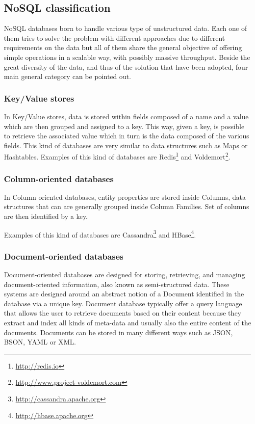 \subsection{NoSQL classification}
NoSQL databases born to handle various type of unstructured data. Each one of them tries to solve the problem with different approaches due to different requirements on the data but all of them share the general objective of offering simple operations in a scalable way, with possibly massive throughput.
Beside the great diversity of the data, and thus of the solution that have been adopted, four main general category can be pointed out.

\subsubsection{Key/Value stores} 
In Key/Value stores, data is stored within fields composed of a name and a value which are then grouped and assigned to a key. This way, given a key, is possible to retrieve the associated value which in turn is the data composed of the various fields. This kind of databases are very similar to data structures such as Maps or Hashtables.
Examples of this kind of databases are Redis\footnote{\url{http://redis.io}} and Voldemort\footnote{\url{http://www.project-voldemort.com}}.

\subsubsection{Column-oriented databases}
In Column-oriented databases, entity properties are stored inside Columns, data structures that can are generally grouped inside Column Families.
Set of columns are then identified by a key.

\noindent Examples of this kind of databases are Cassandra\footnote{\url{http://cassandra.apache.org}} and HBase\footnote{\url{http://hbase.apache.org}}.

\subsubsection{Document-oriented databases}
Document-oriented databases are designed for storing, retrieving, and managing document-oriented information, also known as semi-structured data. 
These systems are designed around an abstract notion of a Document identified in the database via a unique key. 
Document database typically offer a query language that allows the user to retrieve documents based on their content because they extract and index all kinds of meta-data and usually also the entire content of the documents. 
Documents can be stored in many different ways such as JSON, BSON, YAML or XML.

